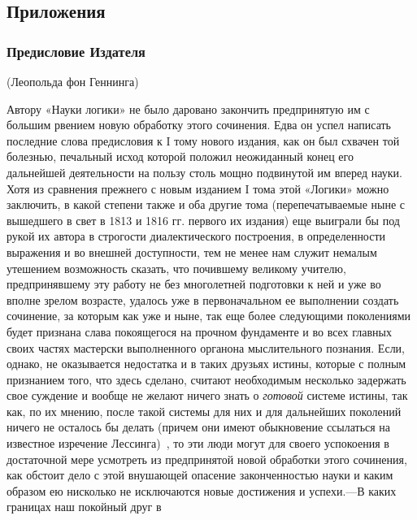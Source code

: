 \clearpage\setcounter{page}{1}\subsection[Приложения]{Приложения}
\hypertarget{Toc478978775}{}\subsubsection[Предисловие Издателя
(94)]{Предисловие Издателя
\textstyleEndnodeLink{(\ref{bkm:Ref474669698}}\textstyleEndnodeLink{)}}
\hypertarget{Toc478978776}{}\label{bkm:bm94}{\centering
(Леопольда фон Геннинга)
\par}

Автору «Науки логики» не было даровано закончить предпринятую им с большим
рвением новую обработку этого сочинения. Едва он успел написать последние
слова предисловия к I тому нового издания, как он был схвачен той болезнью,
печальный исход которой положил неожиданный конец его дальнейшей
деятельности на пользу столь мощно подвинутой им вперед науки. Хотя из
сравнения прежнего с новым изданием I тома этой «Логики» можно заключить, в
какой степени также и оба другие тома (перепечатываемые ныне с вышедшего в
свет в 1813 и 1816 гг. первого их издания) еще выиграли бы под рукой их
автора в строгости диалектического построения, в определенности выражения и
во внешней доступности, тем не менее нам служит немалым утешением
возможность сказать, что почившему великому учителю, предпринявшему эту
работу не без многолетней подготовки к ней и уже во вполне зрелом возрасте,
удалось уже в первоначальном ее выполнении создать сочинение, за которым
как уже и ныне, так еще более следующими поколениями будет признана слава
покоящегося на прочном фундаменте и во всех главных своих частях мастерски
выполненного органона мыслительного познания. Если, однако, не оказывается
недостатка и в таких друзьях истины, которые с полным признанием того, что
здесь сделано, считают необходимым несколько задержать свое суждение и
вообще не желают ничего знать о {\em готовой} системе
истины, так как, по их мнению, после такой системы для них и для дальнейших
поколений ничего не осталось бы делать (причем они имеют обыкновение
ссылаться на известное изречение
Лессинга)~\textstyleEndnodeLink{(}\label{bkm:bm95}\textstyleEndnodeLink{\ref{bkm:Ref474655210})},
то эти люди могут для своего успокоения в достаточной мере усмотреть из
предпринятой новой обработки этого сочинения, как обстоит дело с этой
внушающей опасение законченностью науки и каким образом ею нисколько не
исключаются новые достижения и успехи.—В каких границах наш покойный друг в
